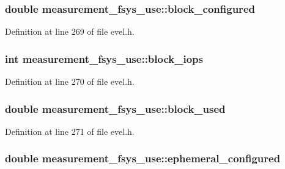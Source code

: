 \subsubsection[{block\+\_\+configured}]{\setlength{\rightskip}{0pt plus 5cm}double measurement\+\_\+fsys\+\_\+use\+::block\+\_\+configured}\label{structmeasurement__fsys__use_af56164f34467ba0112a396955042fa1c}


Definition at line 269 of file evel.\+h.

\hypertarget{structmeasurement__fsys__use_ab41ba374abdbd41b71a029e4be061a24}{}
\subsubsection[{block\+\_\+iops}]{\setlength{\rightskip}{0pt plus 5cm}int measurement\+\_\+fsys\+\_\+use\+::block\+\_\+iops}\label{structmeasurement__fsys__use_ab41ba374abdbd41b71a029e4be061a24}


Definition at line 270 of file evel.\+h.

\hypertarget{structmeasurement__fsys__use_ad156e14eb4f7f3ab929e4b709aa1ebea}{}
\subsubsection[{block\+\_\+used}]{\setlength{\rightskip}{0pt plus 5cm}double measurement\+\_\+fsys\+\_\+use\+::block\+\_\+used}\label{structmeasurement__fsys__use_ad156e14eb4f7f3ab929e4b709aa1ebea}


Definition at line 271 of file evel.\+h.

\hypertarget{structmeasurement__fsys__use_a6cc01785b8eb12d616454fb7070ccaa0}{}
\subsubsection[{ephemeral\+\_\+configured}]{\setlength{\rightskip}{0pt plus 5cm}double measurement\+\_\+fsys\+\_\+use\+::ephemeral\+\_\+configured}\label{structmeasurement__fsys__use_a6cc01785b8eb12d616454fb7070ccaa0}


